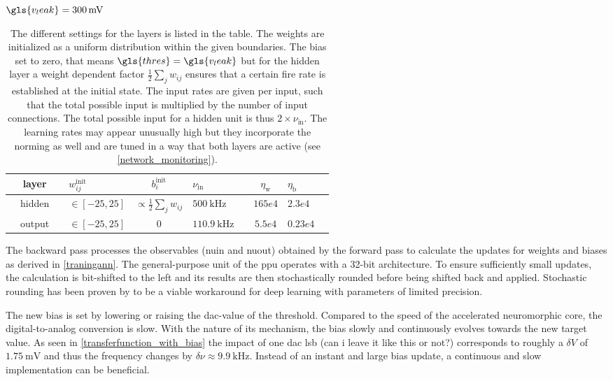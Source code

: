 $\gls{v_leak} = \SI{300}{\milli \V}$
\begin{table}\centering{}
	\begin{tabular}{@{}rcllcllcll@{}}\toprule
		&layer	 & & $w_{ij}^\text{init}$		& $b_i^\text{init}$ & $\nu_{\text{in}}$	& & $\eta_\text{w}$	& $\eta_\text{b}$\\ \midrule
		&hidden  & & $\in[-25, 25]$	& $\propto \frac{1}{2} \sum_j w_{ij}$ & $\SI{500}{\kilo \Hz}$	& & $165e4$			& $2.3e4$		\\
		&output  & & $\in[-25, 25]$	& $0$ & $\SI{110.9}{\kilo\Hz}$& & $5.5e4$			& $0.23e4$		\\ \bottomrule
	\end{tabular}
	\caption{The different settings for the layers is listed in the table. The weights are initialized as a uniform distribution within the given boundaries. The bias set to zero, that means $\gls{thres} = \gls{v_leak}$ but for the hidden layer a weight dependent factor $\frac{1}{2} \sum_j w_{ij}$ ensures that a certain fire rate is established at the initial state. The input rates are given per input, such that the total possible input is multiplied by the number of input connections. The total possible input for a hidden unit is thus $2 \times \nu_\text{in}$. The learning rates may appear unusually high but they incorporate the norming as well and are tuned in a way that both layers are active (see \cref{network_monitoring}).}
\end{table}


The backward pass processes the observables (\gls{nuin} and \gls{nuout}) obtained by the forward pass to calculate the updates for weights and biases as derived in \cref{traningann}. The general-purpose unit of the \gls{ppu} operates with a 32-bit architecture. To ensure sufficiently small updates, the calculation is bit-shifted to the left and its results are then stochastically rounded before being shifted back and applied. Stochastic rounding has been proven by \cite{limitedprecisionpaper} to be a viable workaround for deep learning with parameters of limited precision.

The new bias is set by lowering or raising the \gls{dac}-value of the threshold. Compared to the speed of the accelerated neuromorphic core, the digital-to-analog conversion is slow. With the nature of its mechanism, the bias slowly and continuously evolves towards the new target value. As seen in \cref{transferfunction_with_bias} the impact of one \gls{dac} lsb (can i leave it like this or not?) corresponds to roughly a $\delta V$ of $\SI{1.75}{\milli \V}$ and thus the frequency changes by $\delta \nu \approx \SI{9.9}{\kilo \Hz}$. Instead of an instant and large bias update, a continuous and slow implementation can be beneficial.

